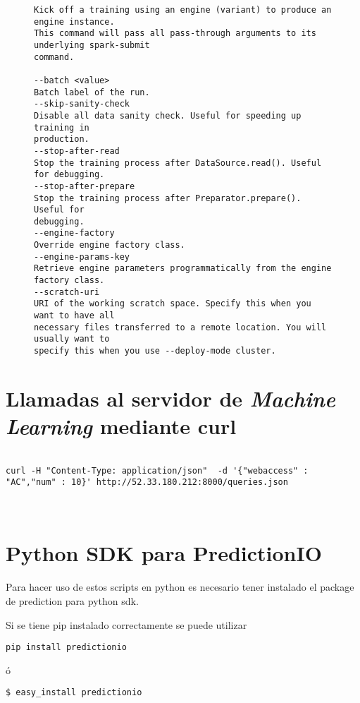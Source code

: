\begin{figure}[tb]
\begin{lstlisting}[frame=single,basicstyle=\ttfamily\tiny,]
Kick off a training using an engine (variant) to produce an engine instance.
This command will pass all pass-through arguments to its underlying spark-submit
command.

--batch <value>
Batch label of the run.
--skip-sanity-check
Disable all data sanity check. Useful for speeding up training in
production.
--stop-after-read
Stop the training process after DataSource.read(). Useful for debugging.
--stop-after-prepare
Stop the training process after Preparator.prepare(). Useful for
debugging.
--engine-factory
Override engine factory class.
--engine-params-key
Retrieve engine parameters programmatically from the engine factory class.
--scratch-uri
URI of the working scratch space. Specify this when you want to have all
necessary files transferred to a remote location. You will usually want to
specify this when you use --deploy-mode cluster.

\end{lstlisting}
	
	
	

\end{figure}


\vspace{1cm}


\section {Llamadas al servidor de \emph{Machine Learning} mediante curl }


\begin{lstlisting}

curl -H "Content-Type: application/json"  -d '{"webaccess" : "AC","num" : 10}' http://52.33.180.212:8000/queries.json



\end{lstlisting}



\section{Python SDK para PredictionIO}

Para hacer uso de estos scripts en python es necesario tener instalado el package de prediction para python sdk.

Si se tiene pip instalado correctamente se puede utilizar

\begin{verbatim}
pip install predictionio
\end{verbatim}
ó
\begin{verbatim}
$ easy_install predictionio
\end{verbatim}


